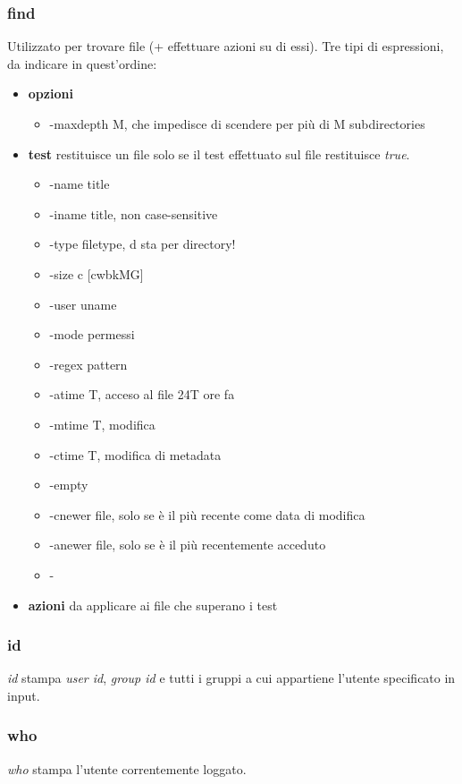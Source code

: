 \subsubsection{find}
Utilizzato per trovare file (+ effettuare azioni su di essi).
Tre tipi di espressioni, da indicare in quest'ordine:
\begin{itemize}
	\item \textbf{opzioni}
	\begin{itemize}
		\item -maxdepth M, che impedisce di scendere per più di M subdirectories
	\end{itemize}
	\item \textbf{test} restituisce un file solo se il test effettuato sul file restituisce \textit{true}.
	\begin{itemize}
		\item -name title
		\item -iname title, non case-sensitive
		\item -type filetype, d sta per directory!
		\item -size c [cwbkMG]
		\item -user uname
		\item -mode permessi
		\item -regex pattern
		\item -atime T, acceso al file 24T ore fa
		\item -mtime T, modifica
		\item -ctime T, modifica di metadata
		\item -empty
		\item -cnewer file, solo se è il più recente come data di modifica
		\item -anewer file, solo se è il più recentemente acceduto
		\item -
	\end{itemize}
	\item \textbf{azioni} da applicare ai file che superano i test
\end{itemize}

\subsubsection{id}
\textit{id} stampa \textit{user id}, \textit{group id} e tutti i gruppi a cui appartiene l'utente specificato in input.

\subsubsection{who}
\textit{who} stampa l'utente correntemente loggato.

